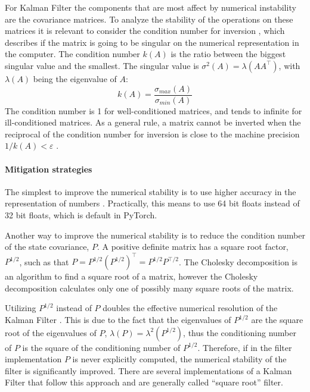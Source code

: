 \documentclass{article}
\begin{document}
For Kalman Filter the components that are most affect by numerical instability are the covariance matrices. To analyze the stability of the operations on these matrices it is relevant to consider the condition number for inversion \cite{mohinder_s_grewal_kalman_2001, kaminski_discrete_1971}, which describes if the matrix is going to be singular on the numerical representation in the computer. The condition number $k(A)$ is the ratio between the biggest singular value and the smallest. The singular value is $\sigma^2(A) = \lambda(AA^\top)$, with  $\lambda(A)$ being the eigenvalue of $A$:
\begin{equation*}%
    k(A) = \frac{\sigma_{max}(A)}{\sigma_{min}(A)}
\end{equation*}
The condition number is 1 for well-conditioned matrices, and tends to infinite for ill-conditioned matrices. As a general rule,  a matrix cannot be inverted when the reciprocal of the condition number for inversion is close to the machine precision $ 1/k(A) < \varepsilon$ \cite{mohinder_s_grewal_kalman_2001}.

\paragraph{Mitigation strategies}
The simplest to improve the numerical stability is to use higher accuracy in the representation of numbers \cite{dan_simon_optimal_2006}. Practically, this means to use 64 bit floats instead of 32 bit floats, which is default in \textsf{PyTorch}.

Another way to improve the numerical stability is to reduce the condition number of the state covariance, $P$. A positive definite matrix has a square root factor, $P^{1/2}$, such as that $P = P^{1/2}(P^{1/2})^\top=P^{1/2}P^{\top/2}$.
The Cholesky decomposition is an algorithm to find a square root of a matrix, however the Cholesky decomposition calculates only one of possibly many square roots of the matrix.

Utilizing $P^{1/2}$ instead of $P$ doubles the effective numerical resolution of the Kalman Filter \cite{kaminski_discrete_1971,dan_simon_optimal_2006,rutten_square-root_2013}. This is due to the fact that the eigenvalues of $P^{1/2}$ are the square root of the eigenvalues of $P$, $\lambda(P) = \lambda^2(P^{1/2})$, thus the conditioning number of $P$ is the square of the conditioning number of $P^{1/2}$. Therefore, if in the filter implementation $P$ is never explicitly computed, the numerical stability of the filter is significantly improved.
There are several implementations of a Kalman Filter that follow this approach \cite{potter_statistical_1963,carlson_fast_1973,bierman_numerical_1977} and are generally called ``square root'' filter.
\end{document}
